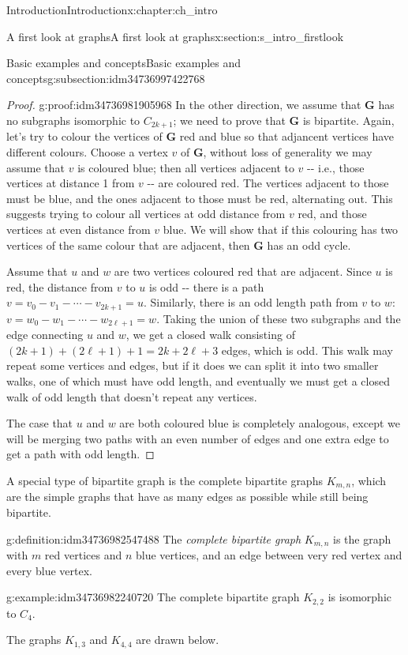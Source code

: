 \documentclass[oneside,10pt,]{book}
\numberwithin{equation}{section}
\newcommand{\bfG}{\mathbf{G}}
\begin{document}
\begin{chapterptx}{Introduction}{}{Introduction}{}{}{x:chapter:ch_intro}
\begin{sectionptx}{A first look at graphs}{}{A first look at graphs}{}{}{x:section:s_intro_firstlook}
\begin{subsectionptx}{Basic examples and concepts}{}{Basic examples and concepts}{}{}{g:subsection:idm34736997422768}
\begin{proof}{}{g:proof:idm34736981905968}
In the other direction, we assume that \(\bfG\) has no subgraphs isomorphic to \(C_{2k+1}\); we need to prove that \(\bfG\) is bipartite.  Again, let's try to colour the vertices of \(\bfG\) red and blue so that adjancent vertices have different colours.  Choose a vertex \(v\) of \(\bfG\), without loss of generality we may assume that \(v\) is coloured blue; then all vertices adjacent to \(v\) -{}-{} i.e., those vertices at distance 1 from \(v\) -{}-{} are coloured red.  The vertices adjacent to those must be blue, and the ones adjacent to those must be red, alternating out.  This suggests trying to colour all vertices at odd distance from \(v\) red, and those vertices at even distance from \(v\) blue.  We will show that if this colouring has two vertices of the same colour that are adjacent, then \(\bfG\) has an odd cycle.%
\par
Assume that \(u\) and \(w\) are two vertices coloured red that are adjacent.  Since \(u\) is red, the distance from \(v\) to \(u\) is odd -{}-{} there is a path \(v=v_0 - v_1 - \cdots - v_{2k+1}=u\).  Similarly, there is an odd length path from \(v\) to \(w\): \(v=w_0 - w_1 - \cdots - w_{2\ell+1}=w\).  Taking the union of these two subgraphs and the edge connecting \(u\) and \(w\), we get a closed walk consisting of \((2k+1)+(2\ell+1)+1=2k+2\ell+3\) edges, which is odd.  This walk may repeat some vertices and edges, but if it does we can split it into two smaller walks, one of which must have odd length, and eventually we must get a closed walk of odd length that doesn't repeat any vertices.%
\par
The case that \(u\) and \(w\) are both coloured blue is completely analogous, except we will be merging two paths with an even number of edges and one extra edge to get a path with odd length.%
\end{proof}
A special type of bipartite graph is the complete bipartite graphs \(K_{m,n}\), which are the simple graphs that have as many edges as possible while still being bipartite.%
\begin{definition}{}{g:definition:idm34736982547488}%
The \emph{complete bipartite graph} \(K_{m,n}\) is the graph with \(m\) red vertices and \(n\) blue vertices, and an edge between very red vertex and every blue vertex.%
\end{definition}
\begin{example}{}{g:example:idm34736982240720}%
The complete bipartite graph \(K_{2,2}\) is isomorphic to \(C_4\).%
\par
The graphs \(K_{1,3}\) and \(K_{4,4}\) are drawn below.%
\begin{image}{0.05}{0.9}{0.05}%
\end{image}
\end{example}
\end{subsectionptx}
\end{sectionptx}
\end{chapterptx}
\end{document}
